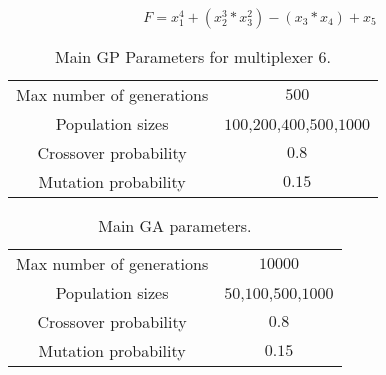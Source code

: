 \begin{equation}
\label{eq:fitness}
 F=x_{1}^{4} + (x_{2}^{3} * x_{3}^{2}) - (x_{3} * x_{4}) + x_{5} 
\end{equation}


\begin{table}
\renewcommand{\arraystretch}{1.3}
\centering
\caption{Main GP Parameters for multiplexer 6.}
\label{Table:par_gp}
\begin{tabular}{cc}
\hline
Max number of generations & $500$ \\
Population sizes & $100$,$200$,$400$,$500$,$1000$ \\
Crossover probability & $0.8$ \\ 
Mutation probability & $0.15$ \\ 
\hline
\end{tabular}
\end{table}


\begin{table}
\renewcommand{\arraystretch}{1.3}
\centering
\tiny
\caption{Main GA parameters.}
\label{Table:par_ga}
\begin{tabular}{cc}
\hline
Max number of generations & $10000$ \\
Population sizes & $50$,$100$,$500$,$1000$ \\
Crossover probability & $0.8$ \\ 
Mutation probability & $0.15$ \\ 
\hline
\end{tabular}
\end{table} 
